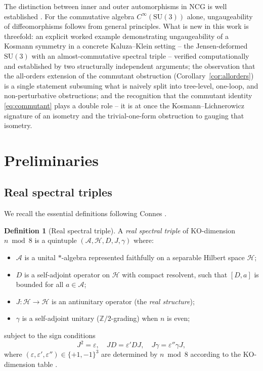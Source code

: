 \documentclass[12pt]{article}
\theoremstyle{definition}
\newtheorem{definition}[theorem]{Definition}
\theoremstyle{remark}
\newcommand{\Hil}{\mathcal{H}}
\newcommand{\Alg}{\mathcal{A}}
\begin{document}
The distinction between inner and outer automorphisms in NCG is well established \cite{Connes1994book, Connes1996gravity, ConnesMarcolli2008book}.  For the commutative algebra $C^\infty(\mathrm{SU}(3))$ alone, ungaugeability of diffeomorphisms follows from general principles.  What is new in this work is threefold: an explicit worked example demonstrating ungaugeability of a Kosmann symmetry in a concrete Kaluza--Klein setting -- the Jensen-deformed $\mathrm{SU}(3)$ with an almost-commutative spectral triple -- verified computationally and established by two structurally independent arguments; the observation that the all-orders extension of the commutant obstruction (Corollary~\ref{cor:allorders}) is a single statement subsuming what is naively split into tree-level, one-loop, and non-perturbative obstructions; and the recognition that the commutant identity \eqref{eq:commutant} plays a double role -- it is at once the Kosmann--Lichnerowicz signature of an isometry and the trivial-one-form obstruction to gauging that isometry.


\section{Preliminaries}
\label{sec:prelim}

\subsection{Real spectral triples}
\label{subsec:spectraltriple}

We recall the essential definitions following Connes \cite{Connes1995reality, Connes1996gravity}.

\begin{definition}[Real spectral triple]
A \emph{real spectral triple} of KO-dimension $n \bmod 8$ is a quintuple $(\Alg, \Hil, D, J, \gamma)$ where:
\begin{itemize}
  \item $\Alg$ is a unital $*$-algebra represented faithfully on a separable Hilbert space $\Hil$;
  \item $D$ is a self-adjoint operator on $\Hil$ with compact resolvent, such that $[D, a]$ is bounded for all $a \in \Alg$;
  \item $J : \Hil \to \Hil$ is an antiunitary operator (the \emph{real structure});
  \item $\gamma$ is a self-adjoint unitary ($\mathbb{Z}/2$-grading) when $n$ is even;
\end{itemize}
subject to the sign conditions
\begin{equation}\label{eq:KOsigns}
  J^2 = \varepsilon, \quad JD = \varepsilon' DJ, \quad J\gamma = \varepsilon'' \gamma J,
\end{equation}
where $(\varepsilon, \varepsilon', \varepsilon'') \in \{+1, -1\}^3$ are determined by $n \bmod 8$ according to the KO-dimension table \cite{Connes1995reality}.
\end{definition}
\end{document}
